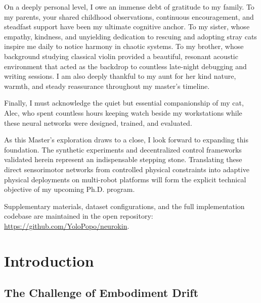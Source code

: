 \documentclass[12pt,a4paper,oneside]{report}
\begin{document}
On a deeply personal level, I owe an immense debt of gratitude to my family. To my parents, your shared childhood observations, continuous encouragement, and steadfast support have been my ultimate cognitive anchor. To my sister, whose empathy, kindness, and unyielding dedication to rescuing and adopting stray cats inspire me daily to notice harmony in chaotic systems. To my brother, whose background studying classical violin provided a beautiful, resonant acoustic environment that acted as the backdrop to countless late-night debugging and writing sessions. I am also deeply thankful to my aunt for her kind nature, warmth, and steady reassurance throughout my master's timeline.

Finally, I must acknowledge the quiet but essential companionship of my cat, Alec, who spent countless hours keeping watch beside my workstations while these neural networks were designed, trained, and evaluated. 

As this Master's exploration draws to a close, I look forward to expanding this foundation. The synthetic experiments and decentralized control frameworks validated herein represent an indispensable stepping stone. Translating these direct sensorimotor networks from controlled physical constraints into adaptive physical deployments on multi-robot platforms will form the explicit technical objective of my upcoming Ph.D. program.

Supplementary materials, dataset configurations, and the full implementation codebase are maintained in the open repository: \url{https://github.com/YoloPopo/neurokin}.

\clearpage

\tableofcontents
\clearpage
\listoffigures
{}
\clearpage
\listoftables
{}
\clearpage


\chapter{Introduction}
\label{chap:intro}

\section{The Challenge of Embodiment Drift}
\label{sec:challenge_embodiment_drift}
\end{document}
